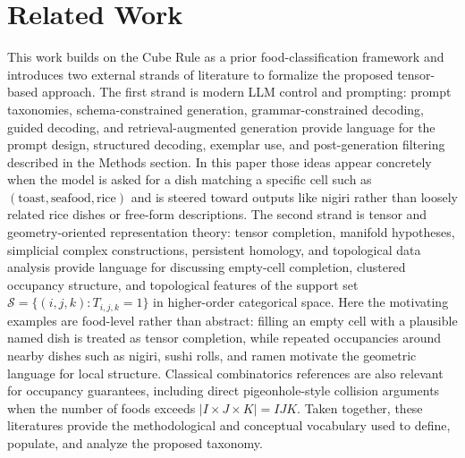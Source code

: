 \section{Related Work}

This work builds on the Cube Rule as a prior food-classification framework and introduces two external strands of literature to formalize the proposed tensor-based approach.
The first strand is modern LLM control and prompting: prompt taxonomies, schema-constrained generation, grammar-constrained decoding, guided decoding, and retrieval-augmented generation provide language for the prompt design, structured decoding, exemplar use, and post-generation filtering described in the Methods section.
In this paper those ideas appear concretely when the model is asked for a dish matching a specific cell such as $(\text{toast}, \text{seafood}, \text{rice})$ and is steered toward outputs like nigiri rather than loosely related rice dishes or free-form descriptions.
The second strand is tensor and geometry-oriented representation theory: tensor completion, manifold hypotheses, simplicial complex constructions, persistent homology, and topological data analysis provide language for discussing empty-cell completion, clustered occupancy structure, and topological features of the support set $\mathcal{S} = \{(i,j,k) : T_{i,j,k}=1\}$ in higher-order categorical space.
Here the motivating examples are food-level rather than abstract: filling an empty cell with a plausible named dish is treated as tensor completion, while repeated occupancies around nearby dishes such as nigiri, sushi rolls, and ramen motivate the geometric language for local structure.
Classical combinatorics references are also relevant for occupancy guarantees, including direct pigeonhole-style collision arguments when the number of foods exceeds $|I \times J \times K| = IJK$.
Taken together, these literatures provide the methodological and conceptual vocabulary used to define, populate, and analyze the proposed taxonomy.
